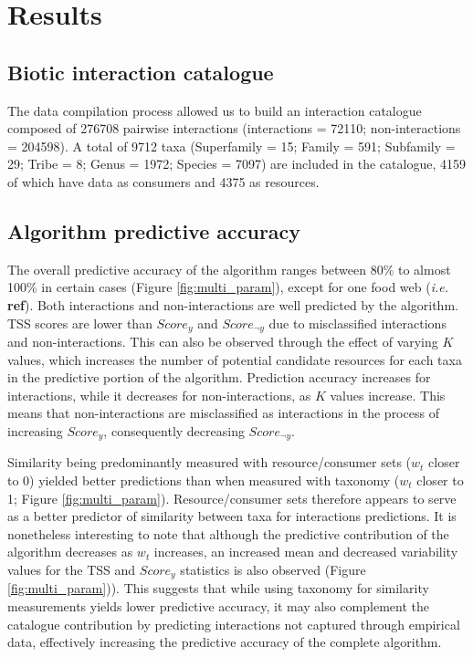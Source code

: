\documentclass[letterpaper]{article}
\begin{document}
\section{Results}
    \subsection{Biotic interaction catalogue}
The data compilation process allowed us to build an interaction catalogue composed of 276708 pairwise interactions (interactions = 72110; non-interactions = 204598). A total of 9712 taxa (Superfamily = 15; Family = 591; Subfamily = 29; Tribe = 8; Genus = 1972; Species = 7097) are included in the catalogue, 4159 of which have data as consumers and 4375 as resources.

    \subsection{Algorithm predictive accuracy}
The overall predictive accuracy of the algorithm ranges between 80\% to almost 100\% in certain cases (Figure \ref{fig:multi_param}), except for one food web (\textit{i.e.} \textbf{ref}). Both interactions and non-interactions are well predicted by the algorithm. TSS scores are lower than $Score_y$ and $Score_{\neg y}$ due to misclassified interactions and non-interactions. This can also be observed through the effect of varying $K$ values, which increases the number of potential candidate resources for each taxa in the predictive portion of the algorithm. Prediction accuracy increases for interactions, while it decreases for non-interactions, as $K$ values increase. This means that non-interactions are misclassified as interactions in the process of increasing $Score_y$, consequently decreasing $Score_{\neg y}$.

Similarity being predominantly measured with resource/consumer sets ($w_t$ closer to 0) yielded better predictions than when measured with taxonomy ($w_t$ closer to 1; Figure \ref{fig:multi_param}). Resource/consumer sets therefore appears to serve as a better predictor of similarity between taxa for interactions predictions. It is nonetheless interesting to note that although the predictive contribution of the algorithm decreases as $w_t$ increases, an increased mean and decreased variability values for the TSS and $Score_y$ statistics is also observed (Figure \ref{fig:multi_param})). This suggests that while using taxonomy for similarity measurements yields lower predictive accuracy, it may also complement the catalogue contribution by predicting interactions not captured through empirical data, effectively increasing the predictive accuracy of the complete algorithm.
\end{document}
